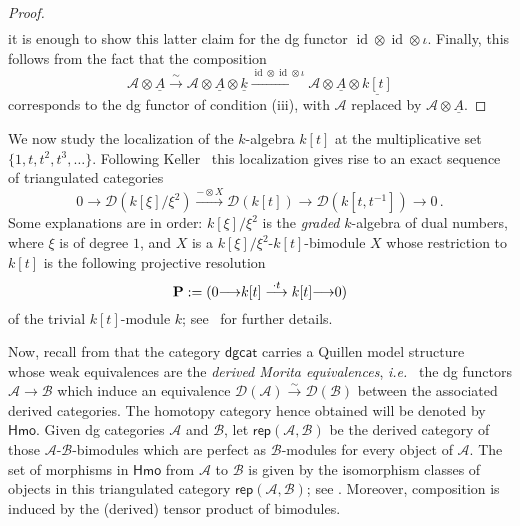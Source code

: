 \documentclass{amsart}
\numberwithin{equation}{subsection}
\theoremstyle{remark}
\theoremstyle{remark}
\theoremstyle{remark}
\theoremstyle{remark}
\begin{document}
\begin{proof}
\begin{eqnarray*}
\end{eqnarray*}
it is enough to show this latter claim for the dg functor $\operatorname{id} \otimes \operatorname{id} \otimes \iota$. Finally, this follows from the fact that the composition
$${{\mathcal A}} \otimes \underline{A} \stackrel{\sim}{\longrightarrow}  {{\mathcal A}} \otimes \underline{A}\otimes \underline{k} \stackrel{\operatorname{id} \otimes \operatorname{id} \otimes \iota}{\longrightarrow} {{\mathcal A}} \otimes \underline{A} \otimes \underline{k[t]}$$
corresponds to the dg functor of condition (iii), with ${{\mathcal A}}$ replaced by ${{\mathcal A}}\otimes \underline{A}$.
\end{proof}
We now study the localization of the $k$-algebra $k[t]$ at the multiplicative set $\{1,t,t^2,t^3, \ldots\}$. Following Keller~\cite[\S4.1]{Keller} this localization gives rise to an exact sequence of triangulated categories
\begin{equation}\label{eq:ses}
0 {\longrightarrow} {{\mathcal D}}(k[\xi]/\xi^2) \stackrel{-\otimes X}{\longrightarrow} {{\mathcal D}}(k[t]) {\longrightarrow} {{\mathcal D}}(k[t,t^{-1}]) {\longrightarrow} 0\,.
\end{equation}
Some explanations are in order: $k[\xi]/\xi^2$ is the {\em graded} $k$-algebra of dual numbers, where $\xi$ is of degree $1$, and $X$ is a $k[\xi]/\xi^2\text{-}k[t]$-bimodule $X$ whose restriction to $k[t]$ is the following projective resolution
\begin{equation}\label{eq:complex}
{\bf P}:=(0 {\longrightarrow} k[t] \stackrel{\cdot t}{\longrightarrow} k[t] {\longrightarrow} 0)
\end{equation}
of the trivial $k[t]$-module $k$; see~\cite[\S4.1 Example~a)]{Keller} for further details.

Now, recall from \cite[Theorem~5.3]{IMRN} that the category ${\mathsf{dgcat}}$ carries a Quillen model structure~\cite{Quillen} whose weak equivalences are the {\em derived Morita equivalences}, {\textsl{i.e.}\ } the dg functors ${{\mathcal A}} \to {{\mathcal B}}$ which induce an equivalence ${{\mathcal D}}({{\mathcal A}}) \stackrel{\sim}{\longrightarrow}{{\mathcal D}}({{\mathcal B}})$ between the associated derived categories. The homotopy category hence obtained will be denoted by ${\mathsf{Hmo}}$. Given dg categories ${{\mathcal A}}$ and ${{\mathcal B}}$, let ${\mathsf{rep}}({{\mathcal A}},{{\mathcal B}})$ be the derived category of those ${{\mathcal A}}\text{-}{{\mathcal B}}$-bimodules which are perfect as ${{\mathcal B}}$-modules for every object of ${{\mathcal A}}$. The set of morphisms in ${\mathsf{Hmo}}$ from ${{\mathcal A}}$ to ${{\mathcal B}}$ is given by the isomorphism classes of objects in this triangulated category ${\mathsf{rep}}({{\mathcal A}}, {{\mathcal B}})$; see \cite[Corollary~5.10]{IMRN}. Moreover, composition is induced by the (derived) tensor product of bimodules.
\end{document}
